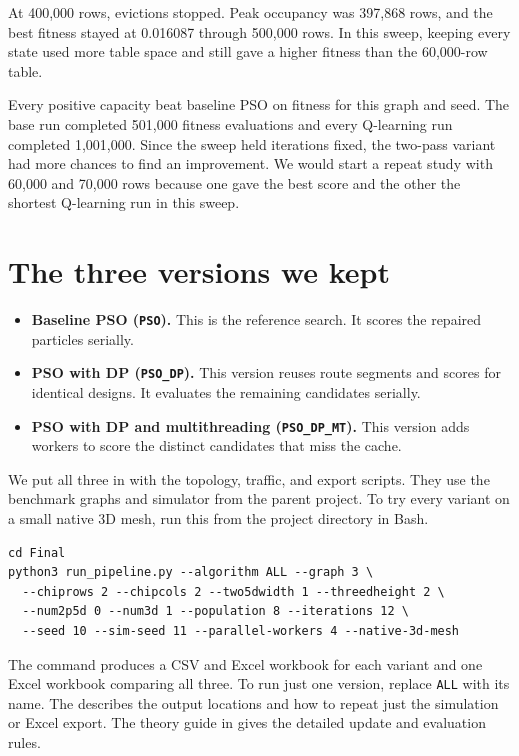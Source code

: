 \documentclass[12pt,a4paper]{article}
\newcommand{\code}[1]{\texttt{#1}}
\begin{document}
At 400,000 rows, evictions stopped. Peak occupancy was 397,868 rows, and the best fitness stayed at 0.016087 through 500,000 rows. In this sweep, keeping every state used more table space and still gave a higher fitness than the 60,000-row table.

Every positive capacity beat baseline PSO on fitness for this graph and seed. The base run completed 501,000 fitness evaluations and every Q-learning run completed 1,001,000. Since the sweep held iterations fixed, the two-pass variant had more chances to find an improvement. We would start a repeat study with 60,000 and 70,000 rows because one gave the best score and the other the shortest Q-learning run in this sweep.

\clearpage
\section{The three versions we kept}

\begin{itemize}
\setlength{\itemsep}{3pt}
\item \textbf{Baseline PSO (\code{PSO}).} This is the reference search. It scores the repaired particles serially.
\item \textbf{PSO with DP (\code{PSO\_DP}).} This version reuses route segments and scores for identical designs. It evaluates the remaining candidates serially.
\item \textbf{PSO with DP and multithreading (\code{PSO\_DP\_MT}).} This version adds workers to score the distinct candidates that miss the cache.
\end{itemize}

We put all three in  with the topology, traffic, and export scripts. They use the benchmark graphs and simulator from the parent project. To try every variant on a small native 3D mesh, run this from the project directory in Bash.

{\small
\begin{verbatim}
cd Final
python3 run_pipeline.py --algorithm ALL --graph 3 \
  --chiprows 2 --chipcols 2 --two5dwidth 1 --threedheight 2 \
  --num2p5d 0 --num3d 1 --population 8 --iterations 12 \
  --seed 10 --sim-seed 11 --parallel-workers 4 --native-3d-mesh
\end{verbatim}
}

The command produces a CSV and Excel workbook for each variant and one Excel workbook comparing all three. To run just one version, replace \code{ALL} with its name. The  describes the output locations and how to repeat just the simulation or Excel export. The theory guide in  gives the detailed update and evaluation rules.
\end{document}
